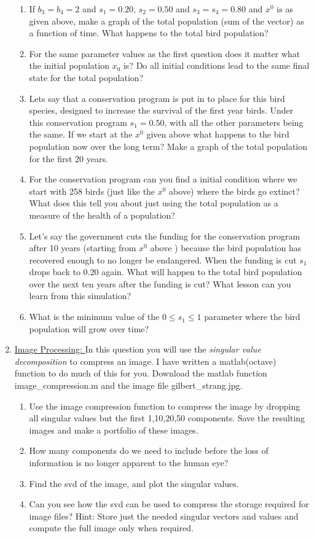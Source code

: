 \documentclass[11pt, a4paper]{article}
\begin{document}
\begin{enumerate}
\begin{enumerate}
\item If $b_3=b_4=2$ and $s_1=0.20$, $s_2=0.50$ and $s_3=s_4=0.80$ and $x^0$ is as given above, make a graph of the total population (sum of the vector) as a function of time. What happens to the total bird population? 
\item For the same parameter values as the first question does it matter what the initial population $x_0$ is? Do all initial conditions lead to the same final state for the total population?
\item Lets say that a conservation program is put in to place for this bird species, designed to increase the survival of the first year birds. Under this conservation program $s_1=0.50$, with all the other parameters being the same. If we start at the $x^0$ given above what happens to the bird population now over the long term? Make a graph of the total population for the first 20 years.
\item For the conservation program can you find a initial condition where we start with 258 birds (just like the $x^0$ above) where the birds go extinct? What does this tell you about just using the total population as a measure of the health of a population?
\item Let's say the government cuts the funding for the conservation program after 10 years (starting from $x^0$ above ) because the bird population has recovered enough to no longer be endangered. When the funding is cut $s_1$ drops back to 0.20 again. What will happen to the total bird population over the next ten years after the funding is cut? What lesson can you learn from this simulation? 
\item What is the minimum value of the $0 \leq s_1 \leq 1$ parameter where the bird population will grow over time? 
\end{enumerate}

\item \underline{Image Processing: } 
In this question you will use the \textit{singular value decomposition} to compress an image. I have written a matlab(octave) function to do much of this for you. Download the matlab function image\_compression.m and the image file gilbert\_strang.jpg. 
\begin{enumerate}
\item Use the image compression function to compress the image by dropping all singular values but the first 1,10,20,50 components. Save the resulting images and make a portfolio of these images. 
\item How many components do we need to include before the loss of information is no longer apparent to the human eye?
\item Find the svd of the image, and plot the singular values. 
\item Can you see how the svd can be used to compress the storage required for image files? Hint: Store just the needed singular vectors and values and compute the full image only when required. 
\end{enumerate}


\end{enumerate}
\end{document}
